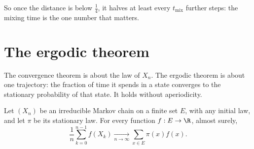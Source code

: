 So once the distance is below $\frac14$, it halves at least every $t_{\mathrm{mix}}$ further steps: the mixing time is the one number that
matters.

\section{The ergodic theorem}

The convergence theorem is about the law of $X_n$. The ergodic theorem is about one trajectory: the fraction of time it
spends in a state converges to the stationary probability of that state. It holds without aperiodicity.

\begin{theorem}\label{thm:ergodic}
Let $(X_n)$ be an irreducible Markov chain on a finite set $E$, with any initial law, and let $\pi$ be its stationary law. For
every function $f:E\to\R$, almost surely,
\[
\frac1n\sum_{k=0}^{n-1}f(X_k)\xrightarrow[n\to\infty]{}\sum_{x\in E}\pi(x)f(x).
\]
\end{theorem}
